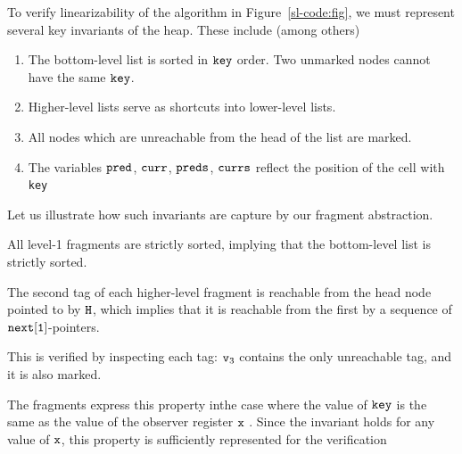 To verify linearizability of the algorithm in Figure~\ref{sl-code:fig},
we must represent several key invariants of the heap. These include (among others)
\begin{enumerate}
\item The bottom-level list is sorted in $\tt key$ order. Two unmarked nodes cannot have the same $\tt key$.
\item Higher-level lists serve as shortcuts into lower-level lists.
\item All nodes which are unreachable from the head of the list are marked.
\item The variables $\tt pred$, $\tt curr$, $\tt preds$, $\tt currs$ reflect the position of the
  cell with {\tt key}
\end{enumerate}
Let us illustrate how such invariants are capture by our fragment abstraction.
\begin{inparaenum}[1)]
\item
  All level-1 fragments are strictly sorted, implying that the bottom-level list is strictly sorted.
\item
  The second tag of each higher-level fragment is reachable from the
  head node pointed to by $\tt H$, which implies that it is reachable from the first
  by a sequence of $\tt next[1]$-pointers.
\item
  This is verified by inspecting each tag: $\mathtt{v}_{3}$ contains the only unreachable tag, and it is also marked.
\item
  The fragments express this property inthe case where the value of $\tt key$ is
  the same as the value of the observer register $\tt x$ . Since the invariant holds for any value of $\tt x$, this property
  is sufficiently represented for the verification
\end{inparaenum}

